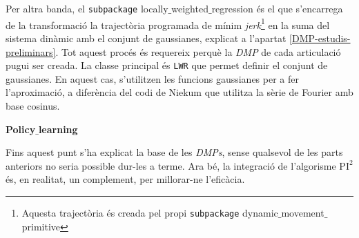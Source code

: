\documentclass[12pt,a4paper,final,twoside]{article}
\begin{document}

Per altra banda, el \texttt{subpackage} locally$\_$weighted$\_$regression és el que s'encarrega de la transformació la trajectòria programada de mínim \textit{jerk}\footnote{Aquesta trajectòria és creada pel propi \texttt{subpackage} dynamic$\_$movement$\_$primitive} en la suma del sistema dinàmic amb el conjunt de gaussianes, explicat a l'apartat \ref{DMP-estudis-preliminars}. Tot aquest procés és requereix perquè la \textit{DMP} de cada articulació pugui ser creada. La classe principal és \texttt{LWR} que permet definir el conjunt de gaussianes. En aquest cas, s'utilitzen les funcions gaussianes per a fer l'aproximació, a diferència del codi de Niekum que utilitza la sèrie de Fourier amb base cosinus. 

\vspace{20pt}
\textbf{Policy$\_$learning}

Fins aquest punt s'ha explicat la base de les \textit{DMPs}, sense qualsevol de les parts anteriors no seria possible dur-les a terme. Ara bé, la integració de l'algorisme $\mathrm{PI^2}$ és, en realitat, un complement, per millorar-ne l'eficàcia. 

\end{document}
